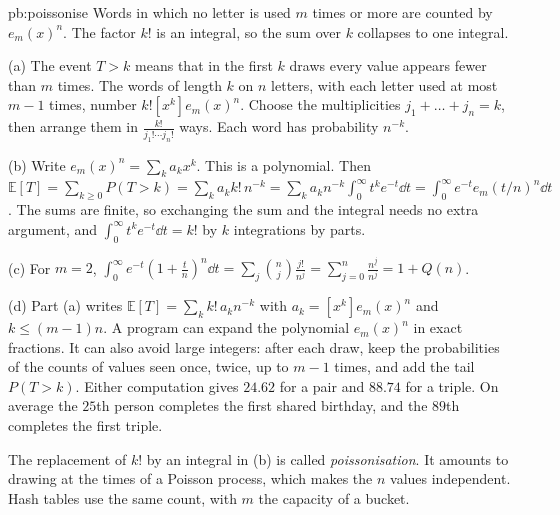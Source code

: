 \begin{solution}{pb:poissonise}
\idea Words in which no letter is used $m$ times or more are counted by $e_m(x)^n$. The factor $k!$ is an integral, so the sum over $k$ collapses to one integral.

\writeup (a) The event $T>k$ means that in the first $k$ draws every value appears fewer than $m$ times. The words of length $k$ on $n$ letters, with each letter used at most $m-1$
times, number $k![x^k]e_m(x)^n$. Choose the multiplicities $j_1+\dots+j_n=k$, then arrange them in $\frac{k!}{j_1!\cdots j_n!}$ ways. Each word has probability $n^{-k}$.

(b) Write $e_m(x)^n=\sum_ka_kx^k$. This is a polynomial. Then
$\mathbb E[T]=\sum_{k\ge0}P(T>k)=\sum_ka_kk!\,n^{-k}=\sum_ka_kn^{-k}\int_0^\infty t^ke^{-t}\dd t=\int_0^\infty e^{-t}e_m(t/n)^n\dd t$.
The sums are finite, so exchanging the sum and the integral needs no extra argument, and $\int_0^\infty t^ke^{-t}\dd t=k!$ by $k$ integrations by parts.

(c) For $m=2$, $\int_0^\infty e^{-t}(1+\frac tn)^n\dd t=\sum_j\binom nj\frac{j!}{n^j}=\sum_{j=0}^n\frac{n^{\underline j}}{n^j}=1+Q(n)$.

(d) Part (a) writes $\mathbb E[T]=\sum_kk!\,a_kn^{-k}$ with $a_k=[x^k]e_m(x)^n$ and $k\le(m-1)n$. A program can expand the polynomial $e_m(x)^n$ in exact fractions. It can also
avoid large integers: after each draw, keep the probabilities of the counts of values seen once, twice, up to $m-1$ times, and add the tail $P(T>k)$. Either computation gives
$24.62$ for a pair and $88.74$ for a triple. On average the $25$th person completes the first shared birthday, and the $89$th completes the first triple.

\leads The replacement of $k!$ by an integral in (b) is called \emph{poissonisation}. It amounts to drawing at the times of a Poisson process, which makes the $n$
values independent. Hash tables use the same count, with $m$ the capacity of a bucket.
\end{solution}

